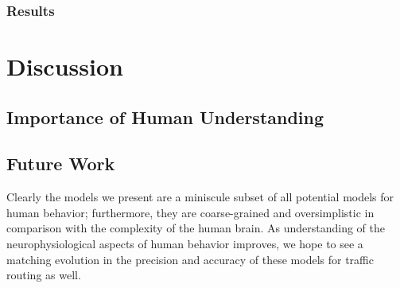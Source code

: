 \documentclass[acmlarge]{acmart}
\begin{document}
\subsubsection{Results}


\section{Discussion}
\subsection{Importance of Human Understanding}
\subsection{Future Work}
Clearly the models we present are a miniscule subset of all potential models for human behavior; 
furthermore, they are coarse-grained and oversimplistic in comparison with the complexity of the human
brain. As understanding of the neurophysiological aspects of human behavior improves, we hope to see a matching evolution in the precision and accuracy of these models for traffic routing as well.



\end{document}
